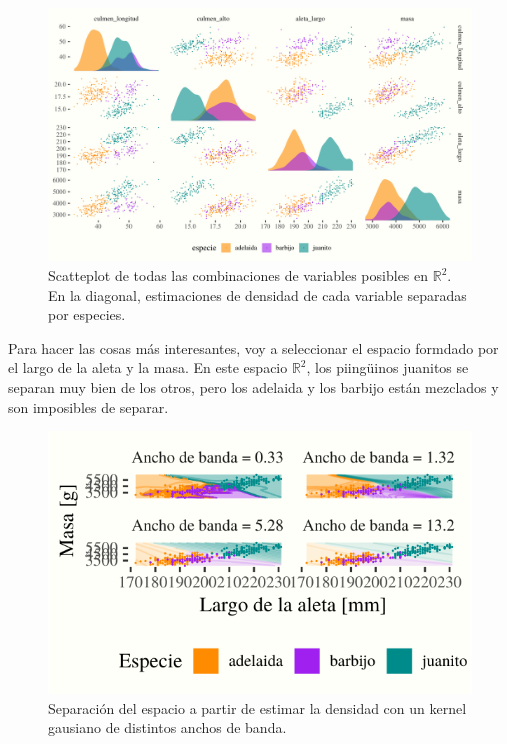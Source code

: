 \documentclass[]{tufte-handout}
\begin{document}
\begin{figure}
\includegraphics{TP-Labo-2_files/figure-latex/pairs-1} \caption[Scatteplot de todas las combinaciones de variables posibles en $\mathbb{R}^2$]{Scatteplot de todas las combinaciones de variables posibles en $\mathbb{R}^2$. En la diagonal, estimaciones de densidad de cada variable separadas por especies.}\label{fig:pairs}
\end{figure}

Para hacer las cosas más interesantes, voy a seleccionar el espacio formdado por el largo de la aleta y la masa. En este espacio \(\mathbb{R}^2\), los piingüinos juanitos se separan muy bien de los otros, pero los adelaida y los barbijo están mezclados y son imposibles de separar.

\begin{figure}
\includegraphics{TP-Labo-2_files/figure-latex/densidad-1} \caption[Separación del espacio a partir de estimar la densidad con un kernel gausiano de distintos anchos de banda]{Separación del espacio a partir de estimar la densidad con un kernel gausiano de distintos anchos de banda.}\label{fig:densidad}
\end{figure}
\end{document}
